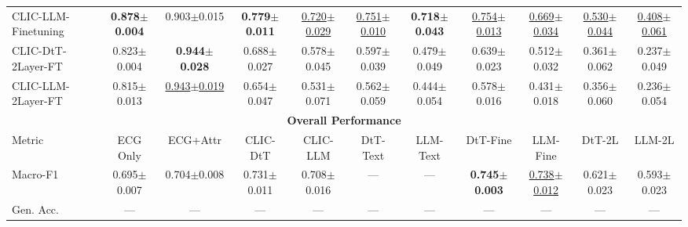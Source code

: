\begin{table}[!h]
{\begin{tabular}{lcccccccccc}
CLIC-LLM-Finetuning &
\textbf{0.878$\pm$0.004} & 0.903$\pm$0.015 &
\textbf{0.779$\pm$0.011} & \underline{0.720$\pm$0.029} &
\underline{0.751$\pm$0.010} & \textbf{0.718$\pm$0.043} &
\underline{0.754$\pm$0.013} & \underline{0.669$\pm$0.034} &
\underline{0.530$\pm$0.044} & \underline{0.408$\pm$0.061} \\

CLIC-DtT-2Layer-FT &
0.823$\pm$0.004 & \textbf{0.944$\pm$0.028} &
0.688$\pm$0.027 & 0.578$\pm$0.045 &
0.597$\pm$0.039 & 0.479$\pm$0.049 &
0.639$\pm$0.023 & 0.512$\pm$0.032 &
0.361$\pm$0.062 & 0.237$\pm$0.049 \\

CLIC-LLM-2Layer-FT &
0.815$\pm$0.013 & \underline{0.943$\pm$0.019} &
0.654$\pm$0.047 & 0.531$\pm$0.071 &
0.562$\pm$0.059 & 0.444$\pm$0.054 &
0.578$\pm$0.016 & 0.431$\pm$0.018 &
0.356$\pm$0.060 & 0.236$\pm$0.054 \\

\midrule
\multicolumn{11}{c}{\textbf{Overall Performance}} \\
\midrule

\multicolumn{1}{l}{Metric}
& \multicolumn{1}{c}{\scriptsize ECG Only}
& \multicolumn{1}{c}{\scriptsize ECG+Attr}
& \multicolumn{1}{c}{\scriptsize CLIC-DtT}
& \multicolumn{1}{c}{\scriptsize CLIC-LLM}
& \multicolumn{1}{c}{\scriptsize DtT-Text}
& \multicolumn{1}{c}{\scriptsize LLM-Text}
& \multicolumn{1}{c}{\scriptsize DtT-Fine}
& \multicolumn{1}{c}{\scriptsize LLM-Fine}
& \multicolumn{1}{c}{\scriptsize DtT-2L}
& \multicolumn{1}{c}{\scriptsize LLM-2L} \\
\cmidrule(lr){1-1} \cmidrule(lr){2-11}

Macro-F1 &
0.695$\pm$0.007 &
0.704$\pm$0.008 &
0.731$\pm$0.011 &
0.708$\pm$0.016 &
--- &
--- &
\textbf{0.745$\pm$0.003} &
\underline{0.738$\pm$0.012} &
0.621$\pm$0.023 &
0.593$\pm$0.023 \\

Gen. Acc. &
--- & --- & --- & --- & --- & --- & --- & --- & --- & --- \\

\bottomrule
\end{tabular}
}
\end{table}
%
%
